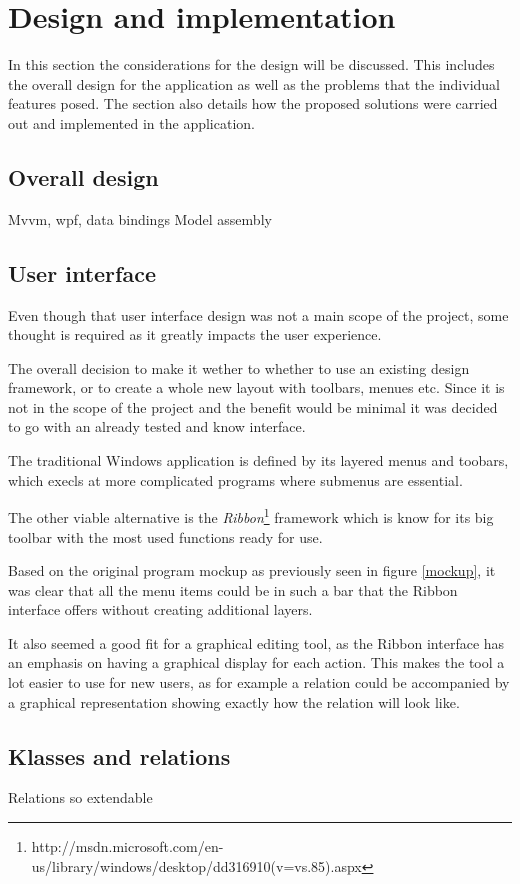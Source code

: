 \section{Design and implementation}
In this section the considerations for the design will be discussed. This
includes the overall design for the application as well as the problems that the
individual features posed. The section also details how the proposed solutions
were carried out and implemented in the application.

\subsection{Overall design}
Mvvm, wpf, data bindings
Model assembly


\subsection{User interface}
Even though that user interface design was not a main scope of the project, some
thought is required as it greatly impacts the user experience. 

The overall decision to make it wether to whether to use an existing design
framework, or to create a whole new layout with toolbars, menues etc. Since it
is not in the scope of the project and the benefit would be minimal it was decided
to go with an already tested and know interface. 

The traditional Windows application is defined by its layered menus and
toobars,
which execls at more complicated programs where submenus are essential.

The other viable alternative is the \textit{Ribbon}\footnote{http://msdn.microsoft.com/en-us/library/windows/desktop/dd316910(v=vs.85).aspx} framework which is know for
its big toolbar with the most used functions ready for use.

Based on the original program mockup as previously seen in figure \ref{mockup},
it was clear that all the menu items could be in such a bar that the Ribbon
interface offers without creating additional layers.

It also seemed a good fit for a graphical editing tool, as the Ribbon interface
has an emphasis on having a graphical display for each action. This makes the
tool a lot easier to use for new users, as for example a relation could be
accompanied by a graphical representation showing exactly how the relation will
look like.

\subsection{Klasses and relations}
Relations so extendable

